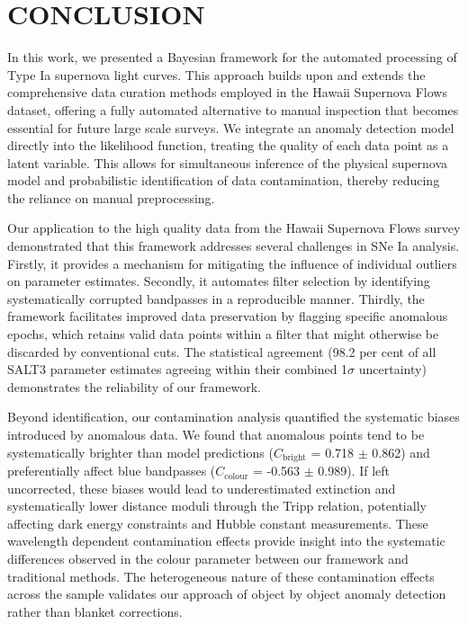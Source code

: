 \section{CONCLUSION}
\label{sec:conclusion}

In this work, we presented a Bayesian framework for the automated processing of Type Ia supernova light curves. This approach builds upon and extends the comprehensive data curation methods employed in the Hawaii Supernova Flows dataset, offering a fully automated alternative to manual inspection that becomes essential for future large scale surveys. We integrate an anomaly detection model directly into the likelihood function, treating the quality of each data point as a latent variable. This allows for simultaneous inference of the physical supernova model and probabilistic identification of data contamination, thereby reducing the reliance on manual preprocessing.

Our application to the high quality data from the Hawaii Supernova Flows survey demonstrated that this framework addresses several challenges in SNe Ia analysis. Firstly, it provides a mechanism for mitigating the influence of individual outliers on parameter estimates. Secondly, it automates filter selection by identifying systematically corrupted bandpasses in a reproducible manner. Thirdly, the framework facilitates improved data preservation by flagging specific anomalous epochs, which retains valid data points within a filter that might otherwise be discarded by conventional cuts. The statistical agreement (98.2 per cent of all SALT3 parameter estimates agreeing within their combined 1$\sigma$ uncertainty) demonstrates the reliability of our framework. 

Beyond identification, our contamination analysis quantified the systematic biases introduced by anomalous data. We found that anomalous points tend to be systematically brighter than model predictions ($C_{\mathrm{bright}}$ = 0.718 $\pm$ 0.862) and preferentially affect blue bandpasses ($C_{\mathrm{colour}}$ = -0.563 $\pm$ 0.989). If left uncorrected, these biases would lead to underestimated extinction and systematically lower distance moduli through the Tripp relation, potentially affecting dark energy constraints and Hubble constant measurements. These wavelength dependent contamination effects provide insight into the systematic differences observed in the colour parameter between our framework and traditional methods. The heterogeneous nature of these contamination effects across the sample validates our approach of object by object anomaly detection rather than blanket corrections.

